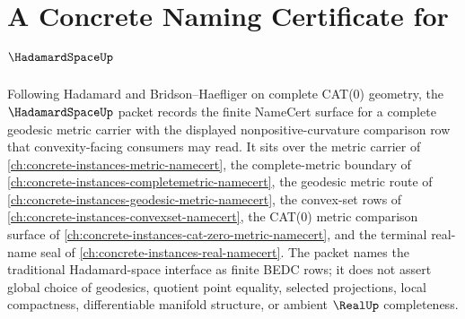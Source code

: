 \chapter{A Concrete Naming Certificate for $\HadamardSpaceUp$}
\label{ch:concrete-instances-hadamard-space-namecert}

Following Hadamard and Bridson--Haefliger on complete CAT(0) geometry, the $\HadamardSpaceUp$ packet records the finite NameCert surface for a complete geodesic metric carrier with the displayed nonpositive-curvature comparison row that convexity-facing consumers may read. It sits over the metric carrier of \autoref{ch:concrete-instances-metric-namecert}, the complete-metric boundary of \autoref{ch:concrete-instances-completemetric-namecert}, the geodesic metric route of \autoref{ch:concrete-instances-geodesic-metric-namecert}, the convex-set rows of \autoref{ch:concrete-instances-convexset-namecert}, the CAT(0) metric comparison surface of \autoref{ch:concrete-instances-cat-zero-metric-namecert}, and the terminal real-name seal of \autoref{ch:concrete-instances-real-namecert}. The packet names the traditional Hadamard-space interface as finite BEDC rows; it does not assert global choice of geodesics, quotient point equality, selected projections, local compactness, differentiable manifold structure, or ambient $\RealUp$ completeness.


